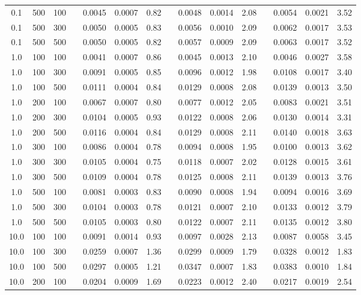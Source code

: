 \documentclass[a4paper,oneside,12pt, class=Latex/Classes/PhDthesisPSnPDF, crop=false]{standalone}
\begin{document}
\begin{table}
{\begin{tabular}{cccclcrclcrclcr}
  0.1 & 500 & 100 && 0.0045 & 0.0007 & 0.82 && 0.0048 & 0.0014 & 2.08 && 0.0054 & 0.0021 & 3.52\\
  0.1 & 500 & 300 && 0.0050 & 0.0005 & 0.83 && 0.0056 & 0.0010 & 2.09 && 0.0062 & 0.0017 & 3.53\\
  0.1 & 500 & 500 && 0.0050 & 0.0005 & 0.82 && 0.0057 & 0.0009 & 2.09 && 0.0063 & 0.0017 & 3.52\\
  1.0 & 100 & 100 && 0.0041 & 0.0007 & 0.86 && 0.0045 & 0.0013 & 2.10 && 0.0046 & 0.0027 & 3.58\\
  1.0 & 100 & 300 && 0.0091 & 0.0005 & 0.85 && 0.0096 & 0.0012 & 1.98 && 0.0108 & 0.0017 & 3.40\\
  1.0 & 100 & 500 && 0.0111 & 0.0004 & 0.84 && 0.0129 & 0.0008 & 2.08 && 0.0139 & 0.0013 & 3.50\\
  1.0 & 200 & 100 && 0.0067 & 0.0007 & 0.80 && 0.0077 & 0.0012 & 2.05 && 0.0083 & 0.0021 & 3.51\\
  1.0 & 200 & 300 && 0.0104 & 0.0005 & 0.93 && 0.0122 & 0.0008 & 2.06 && 0.0130 & 0.0014 & 3.31\\
  1.0 & 200 & 500 && 0.0116 & 0.0004 & 0.84 && 0.0129 & 0.0008 & 2.11 && 0.0140 & 0.0018 & 3.63\\
  1.0 & 300 & 100 && 0.0086 & 0.0004 & 0.78 && 0.0094 & 0.0008 & 1.95 && 0.0100 & 0.0013 & 3.62\\
  1.0 & 300 & 300 && 0.0105 & 0.0004 & 0.75 && 0.0118 & 0.0007 & 2.02 && 0.0128 & 0.0015 & 3.61\\
  1.0 & 300 & 500 && 0.0109 & 0.0004 & 0.78 && 0.0125 & 0.0008 & 2.11 && 0.0139 & 0.0013 & 3.76\\
  1.0 & 500 & 100 && 0.0081 & 0.0003 & 0.83 && 0.0090 & 0.0008 & 1.94 && 0.0094 & 0.0016 & 3.69\\
  1.0 & 500 & 300 && 0.0104 & 0.0003 & 0.78 && 0.0121 & 0.0007 & 2.10 && 0.0133 & 0.0012 & 3.79\\
  1.0 & 500 & 500 && 0.0105 & 0.0003 & 0.80 && 0.0122 & 0.0007 & 2.11 && 0.0135 & 0.0012 & 3.80\\
  10.0 & 100 & 100 && 0.0091 & 0.0014 & 0.93 && 0.0097 & 0.0028 & 2.13 && 0.0087 & 0.0058 & 3.45\\
  10.0 & 100 & 300 && 0.0259 & 0.0007 & 1.36 && 0.0299 & 0.0009 & 1.79 && 0.0328 & 0.0012 & 1.83\\
  10.0 & 100 & 500 && 0.0297 & 0.0005 & 1.21 && 0.0347 & 0.0007 & 1.83 && 0.0383 & 0.0010 & 1.84\\
  10.0 & 200 & 100 && 0.0204 & 0.0009 & 1.69 && 0.0223 & 0.0012 & 2.40 && 0.0217 & 0.0019 & 2.54\\

\end{tabular}}
\end{table}
\end{document}
